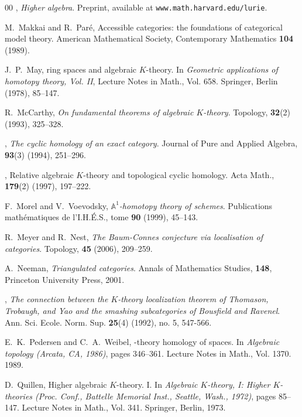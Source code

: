 \documentclass{amsart}
\newcommand{\bbA}{\mathbb{A}}
\numberwithin{equation}{section}
\theoremstyle{definition}
\begin{document}
\begin{thebibliography}{00}
 \bysame, {\em Higher algebra}. Preprint, available at
{\tt www.math.harvard.edu/lurie}.

 M.~Makkai and R.~Par\'{e},
\newblock Accessible categories: the foundations of categorical model
theory.
\newblock American Mathematical Society, Contemporary Mathematics {\bf
104} (1989).

 J.~P.~May,
 ring spaces and algebraic {$K$}-theory.
\newblock In {\em Geometric applications of homotopy theory, Vol. II},
Lecture Notes in Math., Vol. 658. Springer, Berlin (1978), 85--147.
 
 R.~McCarthy, {\em On fundamental theorems of
  algebraic $K$-theory}.  Topology, {\bf 32}(2) (1993), 325--328.

 \bysame, {\em The cyclic homology of an exact category}. Journal of Pure and Applied Algebra, {\bf 93}(3)
  (1994), 251--296.

 \bysame,
\newblock Relative algebraic {$K$}-theory and topological cyclic homology.
\newblock Acta Math., {\bf 179}(2) (1997), 197--222.

 F.~Morel and V.~Voevodsky, {\em $\bbA^1$-homotopy theory of schemes}. Publications math{\'e}matiques de l'I.H.{\'E}.S., tome {\bf 90} (1999), 45--143.

 R.~Meyer and R.~Nest, {\em The Baum-Connes conjecture via localisation of categories}. Topology, {\bf 45} (2006), 209--259.

 A.~Neeman, {\em Triangulated categories}. Annals of
  Mathematics Studies, {\bf 148}, Princeton University Press, 2001.

 \bysame, {\em The connection between the
{$K$}-theory localization theorem of Thomason, Trobaugh, and Yao and
the smashing subcategories of Bousfield and Ravenel}.
Ann. Sci. Ecole. Norm. Sup. {\bf 25}(4) (1992), no. 5, 547-566.


 E.~K.~Pedersen and C.~A.~Weibel,
-theory homology of spaces.
\newblock In {\em Algebraic topology ({A}rcata, {CA}, 1986)}, pages
346--361.  Lecture Notes in Math., Vol. 1370.  1989.

D.~Quillen,
\newblock Higher algebraic {$K$}-theory. {I}.
\newblock In {\em Algebraic $K$-theory, I: Higher $K$-theories (Proc. Conf.,
  Battelle Memorial Inst., Seattle, Wash., 1972)}, pages 85--147. Lecture Notes
  in Math., Vol. 341. Springer, Berlin, 1973.


\end{thebibliography}
\end{document}
